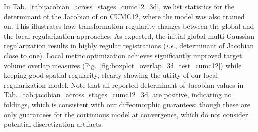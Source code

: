 \documentclass[10pt,twocolumn,letterpaper,table]{article}
\numberwithin{equation}{section}
\theoremstyle{plain}
\theoremstyle{definition}
\def\ie{\emph{i.e.}}  \def\Ie{\emph{I.e.}}
\begin{document}
In Tab.~\ref{tab:jacobian_across_stages_cumc12_3d}, we list statistics for the determinant of the Jacobian of  on CUMC12, where the model was also trained on. This illustrates how transformation regularity changes between the global and the local regularization approaches. As expected, the initial global multi-Gaussian regularization results in highly regular registrations (\ie, determinant of Jacobian close to one). Local metric optimization achieves significantly improved target volume overlap measures (Fig.~\ref{fig:boxplot_overlap_3d_test_cumc12}) while keeping good spatial regularity, clearly showing the utility of our local regularization model. Note that all reported determinant of Jacobian values in Tab.~\ref{tab:jacobian_across_stages_cumc12_3d} are positive, indicating no foldings, which is consistent with our diffeomorphic guarantees; though these are only guarantees for the continuous model at convergence, which do not consider potential discretization artifacts.

\renewcommand{\tabcolsep}{3pt}
\end{document}
